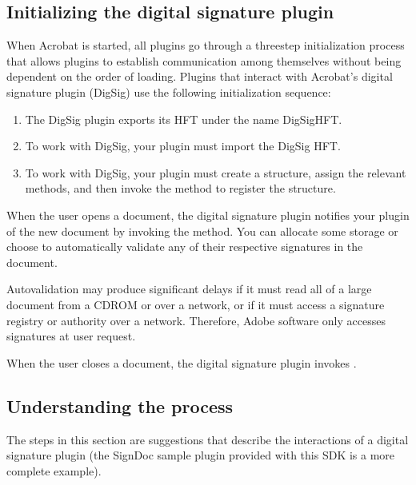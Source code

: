 \documentclass[letterpaper,12pt,english,openany,oneside]{sphinxmanual}
\begin{document}
\subsection{Initializing the digital signature plugin}
\label{\detokenize{Plugins_ExtendedAPI:initializing-the-digital-signature-plugin}}
When Acrobat is started, all plugins go through a three\sphinxhyphen{}step initialization process that allows plugins to establish communication among themselves without being dependent on the order of loading. Plugins that interact with Acrobat’s digital signature plugin (DigSig) use the following initialization sequence:
\begin{enumerate}
%
\item {} 
The DigSig plugin exports its HFT under the name DigSigHFT.

\item {} 
To work with DigSig, your plugin must import the DigSig HFT.

\item {} 
To work with DigSig, your plugin must create a  structure, assign the relevant methods, and then invoke the  method to register the structure.

\end{enumerate}

When the user opens a document, the digital signature plugin notifies your plugin of the new document by invoking the  method. You can allocate some storage or choose to automatically validate any of their respective signatures in the document.

Auto\sphinxhyphen{}validation may produce significant delays if it must read all of a large document from a CD\sphinxhyphen{}ROM or over a network, or if it must access a signature registry or authority over a network. Therefore, Adobe software only accesses signatures at user request.

When the user closes a document, the digital signature plugin invokes .


\subsection{Understanding the process}
\label{\detokenize{Plugins_ExtendedAPI:understanding-the-process}}
The steps in this section are suggestions that describe the interactions of a digital signature plugin (the SignDoc sample plugin provided with this SDK is a more complete example).
\end{document}
